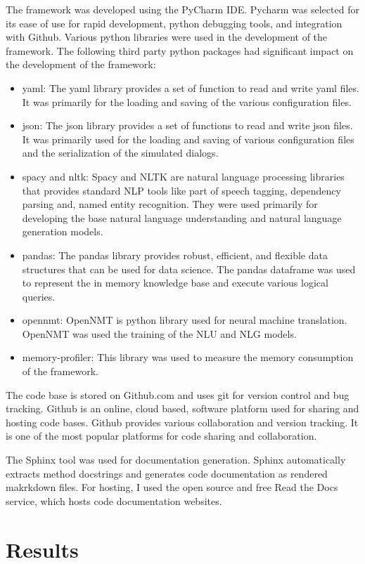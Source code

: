 The framework was developed using the PyCharm IDE. Pycharm was selected for its ease of use for rapid development, python debugging tools, and integration with Github. Various python libraries were used in the development of the framework. The following third party python packages had significant impact on the development of the framework:
\begin{itemize}
	\item yaml: The yaml library provides a set of function to read and write yaml files. It was primarily for the loading and saving of the various configuration files. 
	\item json: The json library provides a set of functions to read and write json files. It was primarily used for the loading and saving of various configuration files and the serialization of the simulated dialogs. 
	\item spacy and nltk: Spacy and NLTK are natural language processing libraries that provides standard NLP tools like part of speech tagging, dependency parsing and, named entity recognition. They were used primarily for developing the base natural language understanding and natural language generation models. 
	\item pandas: The pandas library provides robust, efficient, and flexible data structures that can be used for data science. The pandas dataframe was used to represent the in memory knowledge base and execute various logical queries.
	\item opennmt: OpenNMT is python library used for neural machine translation. OpenNMT was used the training of the NLU and NLG models.
	\item memory-profiler: This library was used to measure the memory consumption of the framework.  
\end{itemize}

The code base is stored on Github.com and uses git for version control and bug tracking. Github is an online, cloud based, software platform used for sharing and hosting code bases. Github provides various collaboration and version tracking. It is one of the most popular platforms for code sharing and collaboration. 

The Sphinx tool was used for documentation generation. Sphinx automatically extracts method docstrings and generates code documentation as rendered makrkdown files. For hosting, I used the open source and free Read the Docs service, which hosts code documentation websites.  

\chapter{Results}

